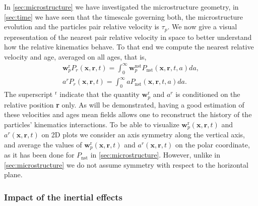 
In \ref{sec:microstructure} we have investigated the microstructure geometry, 
in \ref{sec:time} we have seen that the timescale governing both, the microstructure evolution and the particles pair relative velocity is $\tau_p$.   
We now give a visual representation of the nearest pair relative velocity in space to better understand how the relative kinematics   behave.  
To that end we compute the nearest relative velocity and age, averaged on all ages, that is,
\begin{align*}
    \textbf{w}^\text{r}_pP_r(\textbf{x},\textbf{r},t)
    =\int_0^\infty \textbf{w}^\text{nst}_pP_\text{nst}(\textbf{x},\textbf{r},t,a) da,\\
    a^rP_r(\textbf{x},\textbf{r},t)
    =\int_0^\infty a P_\text{nst}(\textbf{x},\textbf{r},t,a) da.
\end{align*}
The superscript $^\text{r}$ indicate that the quantity $\textbf{w}^\text{r}_p$ and $a^r$ is conditioned on the relative position \textbf{r} only.
As will be demonstrated, having a good estimation of these velocities and ages mean fields allows one to reconstruct the history of the particles' kinematics   interactions. 
To be able to visualize
$\textbf{w}^\text{r}_p(\textbf{x},\textbf{r},t)$
and 
$a^r(\textbf{x},\textbf{r},t)$
on 2D plots we consider an axis symmetry along the vertical axis, and average the values of 
$\textbf{w}^\text{r}_p(\textbf{x},\textbf{r},t)$
and $a^r(\textbf{x},\textbf{r},t)$
on the polar coordinate, as it has been done for $P_\text{nst}$ in \ref{sec:microstructure}. 
However, unlike in \ref{sec:microstructure} we do not assume symmetry with respect to the horizontal plane. 

\subsubsection*{Impact of the inertial effects}

